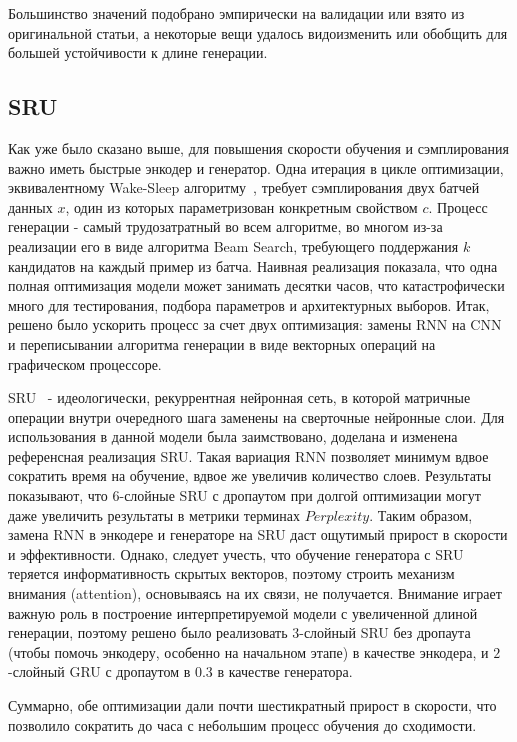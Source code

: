 \documentclass{spbau-diploma}
\begin{document}
Большинство значений подобрано эмпирически на валидации или 
взято из оригинальной статьи, а некоторые вещи удалось видоизменить или 
обобщить для большей устойчивости к длине генерации.

\subsection{SRU}
Как уже было сказано выше, для повышения скорости обучения и сэмплирования 
важно иметь быстрые энкодер и генератор. Одна итерация в цикле оптимизации, 
эквивалентному Wake-Sleep алгоритму~\cite{text_cvae}, требует сэмплирования двух
батчей данных $x$, один из которых параметризован конкретным свойством $c$.
Процесс генерации - самый трудозатратный во всем алгоритме, во многом из-за
реализации его в виде алгоритма Beam Search, требующего поддержания $k$ 
кандидатов на каждый пример из батча. Наивная реализация показала, что 
одна полная оптимизация модели может занимать десятки часов, что 
катастрофически много для тестирования, подбора параметров и архитектурных 
выборов. Итак, решено было ускорить процесс за счет двух оптимизация: замены 
RNN на CNN и переписывании алгоритма генерации в виде векторных операций на 
графическом процессоре.

SRU~\cite{1709.02755} - идеологически, рекуррентная нейронная сеть, в которой
матричные операции внутри очередного шага заменены на сверточные нейронные
слои. Для использования в данной модели была заимствовано, доделана и
изменена референсная реализация SRU. Такая вариация RNN позволяет минимум
вдвое сократить время на обучение, вдвое же увеличив количество слоев.
Результаты показывают, что $6$-слойные SRU с дропаутом при долгой оптимизации
могут даже увеличить результаты в метрики терминах $Perplexity$. Таким
образом, замена RNN в энкодере и генераторе на SRU даст ощутимый прирост в
скорости и эффективности. Однако, следует учесть, что обучение генератора с
SRU теряется информативность скрытых векторов, поэтому строить механизм
внимания (attention), основываясь на их связи, не получается. Внимание играет
важную роль в построение интерпретируемой модели с увеличенной длиной генерации,
поэтому решено было реализовать $3$-слойный SRU без дропаута
(чтобы помочь энкодеру, особенно на начальном этапе)
в качестве энкодера, и $2$-слойный GRU с дропаутом в $0.3$ в качестве
генератора.

Суммарно, обе оптимизации дали почти шестикратный прирост в скорости,
что позволило сократить до часа с небольшим процесс обучения до сходимости.
\end{document}
